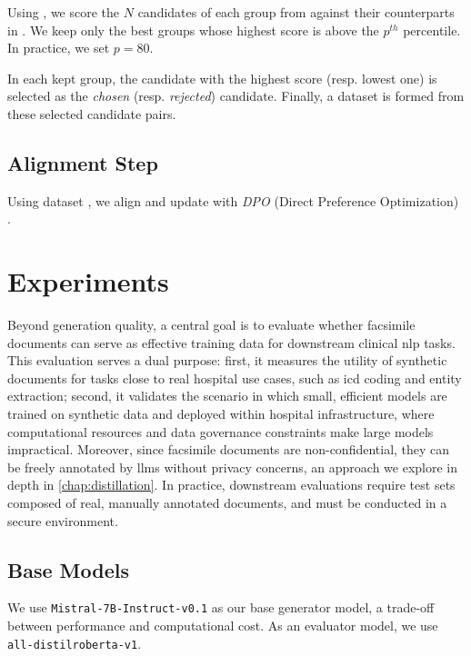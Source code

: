 Using \me, we score the $N$ candidates of each group from \dgstar against their counterparts in \dtr. We keep only the best groups whose highest score is above the $p^{th}$ percentile. In practice, we set $p = 80$. 

In each kept group, the candidate with the highest score (resp. lowest one) is selected as the \textit{chosen} (resp.  \textit{rejected}) candidate. Finally, a dataset \ddpo is formed from these selected candidate pairs.

 
\subsection{Alignment Step}
Using dataset \ddpo, we align and update \mg with \textit{DPO} (Direct Preference Optimization) \citep{rafailov2023dpo}.

\section{Experiments}
\label{sec:experiment}

Beyond generation quality, a central goal is to evaluate whether facsimile documents can serve as effective training data for downstream clinical \gls{nlp} tasks.
This evaluation serves a dual purpose: first, it measures the utility of synthetic documents for tasks close to real hospital use cases, such as \gls{icd} coding and entity extraction; second, it validates the scenario in which small, efficient models are trained on synthetic data and deployed within hospital infrastructure, where computational resources and data governance constraints make large models impractical.
Moreover, since facsimile documents are non-confidential, they can be freely annotated by \glspl{llm} without privacy concerns, an approach we explore in depth in \autoref{chap:distillation}.
In practice, downstream evaluations require test sets composed of real, manually annotated documents, and must be conducted in a secure environment.

\subsection{Base Models}
We use \space\verb|Mistral-7B-Instruct-v0.1|\space\citep{jiangMistral7B2023} as our base generator model, a trade-off between performance and computational cost. As an evaluator model, we use \space\verb|all-distilroberta-v1|.

